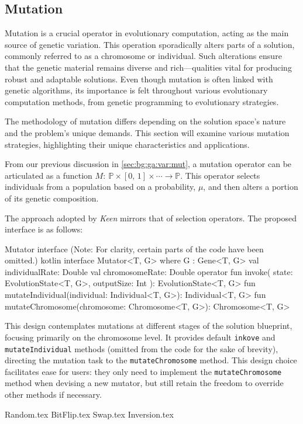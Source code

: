 \subsection{Mutation}
\label{sec:keen:op:mut}
  Mutation is a crucial operator in evolutionary computation, acting as the main source of genetic variation.
  This operation sporadically alters parts of a solution, commonly referred to 
  as a chromosome or individual. Such alterations ensure that the genetic 
  material remains diverse and rich—qualities vital for producing robust and 
  adaptable solutions. Even though mutation is often linked with genetic 
  algorithms, its importance is felt throughout various evolutionary 
  computation methods, from genetic programming to evolutionary strategies.

  The methodology of mutation differs depending on the solution space's nature 
  and the problem's unique demands. This section will examine various mutation strategies, highlighting their unique characteristics and applications.

  From our previous discussion in \vref{sec:bg:ga:var:mut}, a mutation operator 
  can be articulated as a function \(M :\: \mathbb{P} \times [0,\, 1] \times 
  \cdots \to \mathbb{P}\). This operator selects individuals from a population 
  based on a probability, \(\mu\), and then alters a portion of its genetic 
  composition.

  The approach adopted by \textit{Keen} mirrors that of selection operators. 
  The proposed interface is as follows:

  \begin{code}{
    Mutator interface (Note: For clarity, certain parts of the code have been omitted.)
  }{}{kotlin}
    interface Mutator<T, G> where G : Gene<T, G> {
        val individualRate: Double
        val chromosomeRate: Double
        operator fun invoke(
            state: EvolutionState<T, G>, outputSize: Int
        ): EvolutionState<T, G>
        fun mutateIndividual(individual: Individual<T, G>): Individual<T, G>
        fun mutateChromosome(chromosome: Chromosome<T, G>): Chromosome<T, G>
    }
  \end{code}

  This design contemplates mutations at different stages of the solution 
  blueprint, focusing primarily on the chromosome level. It provides default
  \texttt{inkove} and \texttt{mutateIndividual} methods (omitted from the code 
  for the sake of brevity), directing the mutation task to the 
  \texttt{mutateChromosome} method. This design choice facilitates ease for
  users: they only need to implement the \texttt{mutateChromosome} method when
  devising a new mutator, but still retain the freedom to override other methods 
  if necessary.

  {Random.tex}
  {BitFlip.tex}
  {Swap.tex}
  {Inversion.tex}

